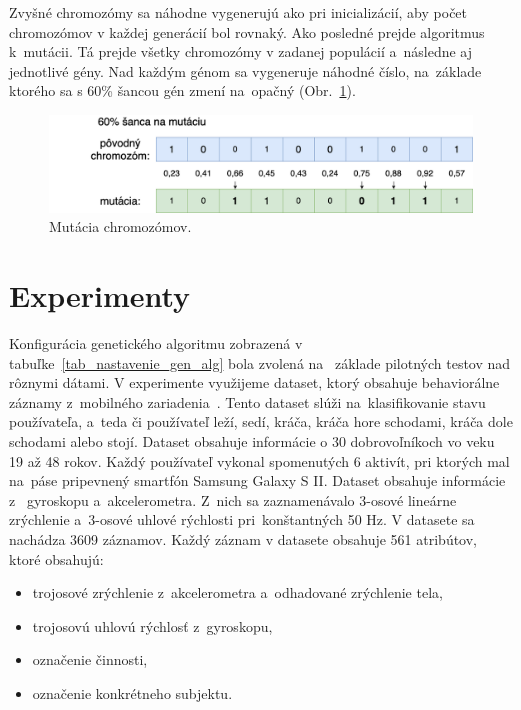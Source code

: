 \documentclass[runningheads]{llncs}
\begin{document}
Zvyšné chromozómy sa náhodne vygenerujú ako pri inicializácií, aby počet chromozómov v každej generácií bol rovnaký. 
Ako posledné prejde algoritmus k~mutácii. Tá prejde všetky chromozómy v zadanej populácií a~následne aj jednotlivé gény.
Nad každým génom sa vygeneruje náhodné číslo, na~základe ktorého sa s 60\% šancou gén zmení na~opačný (Obr.~\ref{fig_ga_mutovanie}). 

\begin{figure}
\includegraphics[width=\textwidth]{image/mutacia.png}
\caption{Mutácia chromozómov.} \label{fig_ga_mutovanie}
\end{figure}




\section{Experimenty}

Konfigurácia genetického algoritmu zobrazená v tabuľke~\ref{tab_nastavenie_gen_alg} bola zvolená na~
základe pilotných testov nad rôznymi dátami. V experimente využijeme dataset, ktorý obsahuje behaviorálne 
záznamy z~mobilného zariadenia~\cite{ref_dataset_anguita,ref_dataset}. Tento dataset slúži na~klasifikovanie
stavu používateľa, a~teda či používateľ leží, sedí, kráča, kráča hore schodami, kráča dole schodami alebo stojí.
Dataset obsahuje informácie o 30 dobrovoľníkoch vo veku 19 až 48 rokov. Každý používateľ vykonal spomenutých
6 aktivít, pri ktorých mal na~páse pripevnený smartfón Samsung Galaxy S II. Dataset obsahuje informácie z~
gyroskopu a~akcelerometra. Z~nich sa zaznamenávalo 3-osové lineárne zrýchlenie a~3-osové uhlové rýchlosti 
pri~konštantných 50 Hz. V datasete sa nachádza 3609 záznamov. Každý záznam v datasete obsahuje 561 atribútov, ktoré obsahujú:

\begin{itemize}
\item trojosové zrýchlenie z~akcelerometra a~odhadované zrýchlenie tela,
\item trojosovú uhlovú rýchlosť z~gyroskopu,
\item označenie činnosti,
\item označenie konkrétneho subjektu.
\end{itemize}
\end{document}
